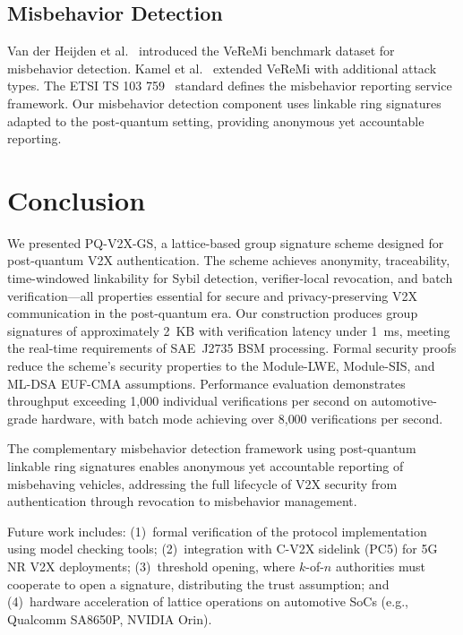 \documentclass[conference,10pt]{IEEEtran}
\begin{document}
\subsection{Misbehavior Detection}

Van der Heijden et al.~\cite{vanderheijden2018} introduced the VeReMi benchmark dataset for misbehavior detection. Kamel et al.~\cite{kamel2020} extended VeReMi with additional attack types. The ETSI TS 103 759~\cite{etsits103759} standard defines the misbehavior reporting service framework. Our misbehavior detection component uses linkable ring signatures~\cite{liu2004linkable} adapted to the post-quantum setting, providing anonymous yet accountable reporting.

\section{Conclusion}
\label{sec:conclusion}

We presented PQ-V2X-GS, a lattice-based group signature scheme designed for post-quantum V2X authentication. The scheme achieves anonymity, traceability, time-windowed linkability for Sybil detection, verifier-local revocation, and batch verification---all properties essential for secure and privacy-preserving V2X communication in the post-quantum era. Our construction produces group signatures of approximately 2~KB with verification latency under 1~ms, meeting the real-time requirements of SAE~J2735 BSM processing. Formal security proofs reduce the scheme's security properties to the Module-LWE, Module-SIS, and ML-DSA EUF-CMA assumptions. Performance evaluation demonstrates throughput exceeding 1{,}000 individual verifications per second on automotive-grade hardware, with batch mode achieving over 8{,}000 verifications per second.

The complementary misbehavior detection framework using post-quantum linkable ring signatures enables anonymous yet accountable reporting of misbehaving vehicles, addressing the full lifecycle of V2X security from authentication through revocation to misbehavior management.

Future work includes: (1)~formal verification of the protocol implementation using model checking tools; (2)~integration with C-V2X sidelink (PC5) for 5G NR V2X deployments; (3)~threshold opening, where $k$-of-$n$ authorities must cooperate to open a signature, distributing the trust assumption; and (4)~hardware acceleration of lattice operations on automotive SoCs (e.g., Qualcomm SA8650P, NVIDIA Orin).

\balance



\end{document}
